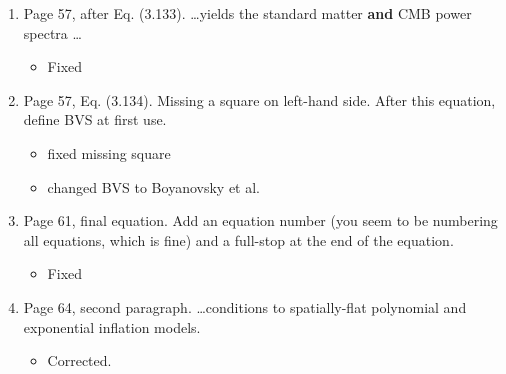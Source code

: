 \documentclass[11pt]{article}
\begin{document}
\begin{enumerate}
\item Page 57, after Eq. (3.133). \ldots yields the standard matter
  \textbf{and} CMB power spectra \ldots
  \begin{itemize}
    \item Fixed
  \end{itemize}
\item Page 57, Eq. (3.134). Missing a square on left-hand side. After
  this equation, define BVS at first use.
  \begin{itemize}
    \item fixed missing square 
    \item changed BVS to Boyanovsky et al.
  \end{itemize}
\item Page 61, final equation. Add an equation number (you seem to be
  numbering all equations, which is fine) and a full-stop at the end
  of the equation.
  \begin{itemize}
    \item Fixed
  \end{itemize}
\item Page 64, second paragraph. \ldots conditions to spatially-flat
  polynomial and exponential inflation models.
  \begin{itemize}
    \item Corrected.
  \end{itemize}
\end{enumerate}
\end{document}
